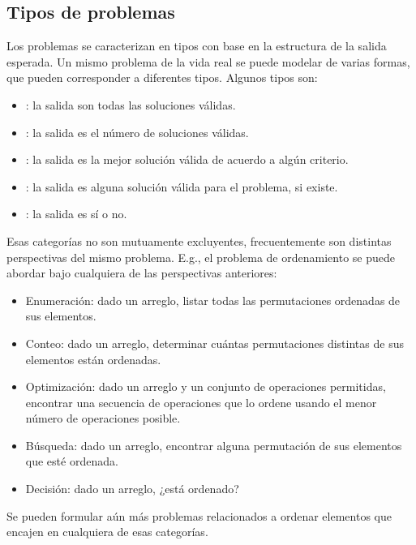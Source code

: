 \subsection{Tipos de problemas}

Los problemas se caracterizan en tipos con base en la estructura de la salida esperada. Un mismo problema de la vida real se puede modelar de varias formas, que pueden corresponder a diferentes tipos. Algunos tipos son:
\begin{itemize}
  \item {}: la salida son todas las soluciones válidas.
  \item {}: la salida es el número de soluciones válidas.
  \item {}: la salida es la mejor solución válida de acuerdo a algún criterio.
  \item {}: la salida es alguna solución válida para el problema, si existe.
  \item {}\label{problema_decision}: la salida es sí o no.
\end{itemize}
Esas categorías no son mutuamente excluyentes, frecuentemente son distintas perspectivas del mismo problema. E.g., el problema de ordenamiento se puede abordar bajo cualquiera de las perspectivas anteriores:
\begin{itemize}
  \item Enumeración: dado un arreglo, listar todas las permutaciones ordenadas de sus elementos.
  \item Conteo: dado un arreglo, determinar cuántas permutaciones distintas de sus elementos están ordenadas.
  \item Optimización: dado un arreglo y un conjunto de operaciones permitidas, encontrar una secuencia de operaciones que lo ordene usando el menor número de operaciones posible.
  \item Búsqueda: dado un arreglo, encontrar alguna permutación de sus elementos que esté ordenada.
  \item Decisión: dado un arreglo, ¿está ordenado?
\end{itemize}
Se pueden formular aún más problemas relacionados a ordenar elementos que encajen en cualquiera de esas categorías. 
